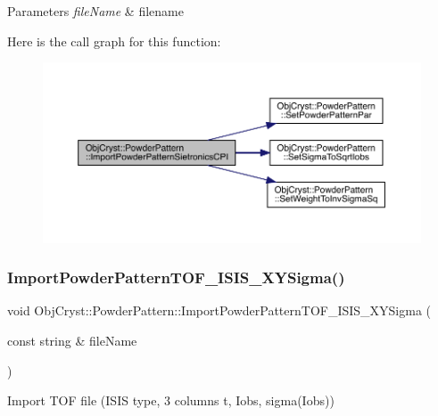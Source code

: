 \begin{DoxyParams}{Parameters}
{\em file\+Name} & filename \\
\hline
\end{DoxyParams}
Here is the call graph for this function\+:
\nopagebreak
\begin{figure}[H]
\begin{center}
\leavevmode
\includegraphics[width=350pt]{class_obj_cryst_1_1_powder_pattern_adabe6381d8d1189abcf420f69a41cc81_cgraph}
\end{center}
\end{figure}
\mbox{\label{class_obj_cryst_1_1_powder_pattern_a9d7209065acb5a992129cf6a2b14b526}} 
\subsubsection{\texorpdfstring{ImportPowderPatternTOF\_ISIS\_XYSigma()}{ImportPowderPatternTOF\_ISIS\_XYSigma()}}
{\footnotesize\ttfamily void Obj\+Cryst\+::\+Powder\+Pattern\+::\+Import\+Powder\+Pattern\+T\+O\+F\+\_\+\+I\+S\+I\+S\+\_\+\+X\+Y\+Sigma (\begin{DoxyParamCaption}\item[{const string \&}]{file\+Name }\end{DoxyParamCaption})}



Import T\+OF file (I\+S\+IS type, 3 columns t, Iobs, sigma(\+Iobs)) 


